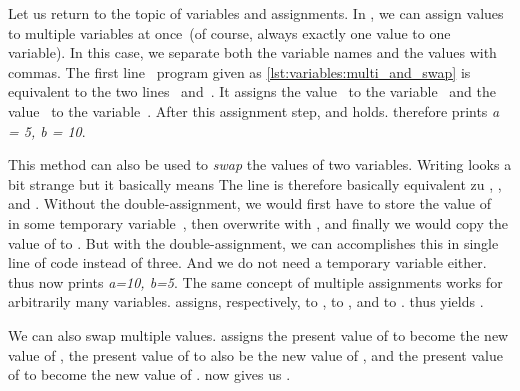 %
%
%
%
%
Let us return to the topic of variables and assignments.
In \python, we can assign values to multiple variables at once~(of course, always exactly one value to one variable).
In this case, we separate both the variable names and the values with commas.
The first line~\pythonIdx{,} program  given as \cref{lst:variables:multi_and_swap} is equivalent to the two lines~ and~.
It assigns the value~ to the variable~ and the value~ to the variable~.
After this assignment step,  and  holds.
 therefore prints \textit{a = 5, b = 10}.

This method can also be used to \emph{swap} the values of two variables.
Writing  looks a bit strange but it basically means 
The line is therefore basically equivalent zu , , and .
Without the double-assignment, we would first have to store the value of~ in some temporary variable~, then overwrite  with , and finally we would copy the value of  to .
But with the double-assignment, we can accomplishes this in single line of code instead of three.
And we do not need a temporary variable either.
 thus now prints \textit{a=10, b=5}.%
%
%
%
The same concept of multiple assignments works for arbitrarily many variables.
 assigns, respectively,  to ,  to , and  to .
 thus yields .

We can also swap multiple values.
 assigns the present value of  to become the new value of , the present value of  to also be the new value of , and the present value of  to become the new value of .
 now gives us .
%
\FloatBarrier%
\endhsection%
%
